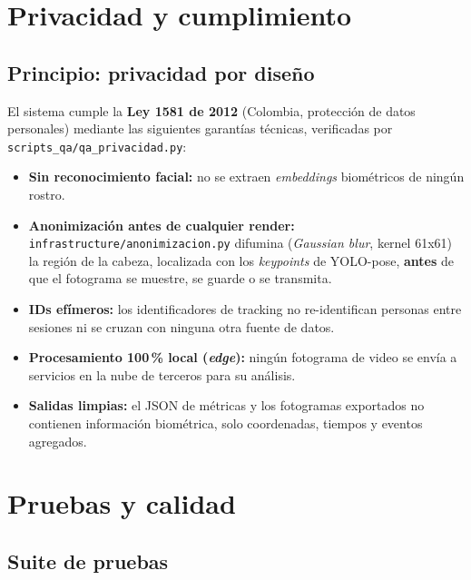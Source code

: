 \documentclass[11pt,a4paper]{report}
\begin{document}
\chapter{Privacidad y cumplimiento}

\section{Principio: privacidad por diseño}

El sistema cumple la \textbf{Ley 1581 de 2012} (Colombia, protección de datos personales)
mediante las siguientes garantías técnicas, verificadas por \texttt{scripts\_qa/qa\_privacidad.py}:

\begin{itemize}
  \item \textbf{Sin reconocimiento facial:} no se extraen \textit{embeddings} biométricos de
    ningún rostro.
  \item \textbf{Anonimización antes de cualquier render:} \texttt{infrastructure/anonimizacion.py}
    difumina (\textit{Gaussian blur}, kernel 61x61) la región de la cabeza, localizada con los
    \textit{keypoints} de YOLO-pose, \textbf{antes} de que el fotograma se muestre, se guarde o
    se transmita.
  \item \textbf{IDs efímeros:} los identificadores de tracking no re-identifican personas entre
    sesiones ni se cruzan con ninguna otra fuente de datos.
  \item \textbf{Procesamiento 100\,\% local (\textit{edge}):} ningún fotograma de video se
    envía a servicios en la nube de terceros para su análisis.
  \item \textbf{Salidas limpias:} el JSON de métricas y los fotogramas exportados no contienen
    información biométrica, solo coordenadas, tiempos y eventos agregados.
\end{itemize}

\chapter{Pruebas y calidad}
\label{sec:rendimiento}

\section{Suite de pruebas}
\end{document}
